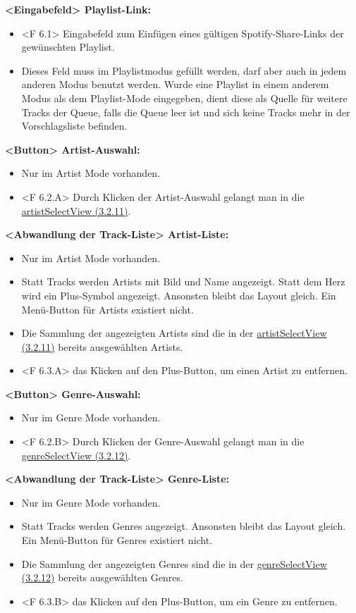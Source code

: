 \documentclass[oneside, ngerman]{sdqtechreport}
\begin{document}
\textbf{<Eingabefeld> Playlist-Link:}
\begin{itemize}
    \item <F 6.1> Eingabefeld zum Einfügen eines gültigen Spotify-Share-Links der gewünschten Playlist.
    \item Dieses Feld muss im Playlistmodus gefüllt werden, darf aber auch in jedem anderen Modus benutzt werden. Wurde eine Playlist in einem anderem Modus als dem Playlist-Mode eingegeben, dient diese als Quelle für weitere Tracks der Queue, falls die Queue leer ist und sich keine Tracks mehr in der Vorschlagsliste befinden.
\end{itemize}

\textbf{<Button> Artist-Auswahl:}
\begin{itemize}
    \item Nur im Artist Mode vorhanden.
    \item <F 6.2.A> Durch Klicken der Artist-Auswahl gelangt man in die \hyperlink{artistSelectView}{artistSelectView (3.2.11)}.
\end{itemize}

\textbf{<Abwandlung der Track-Liste> Artist-Liste:}
\begin{itemize}
    \item Nur im Artist Mode vorhanden.
    \item Statt Tracks werden Artists mit Bild und Name angezeigt. Statt dem Herz wird ein Plus-Symbol angezeigt. Ansonsten bleibt das Layout gleich. Ein Menü-Button für Artists existiert nicht.
    \item Die Sammlung der angezeigten Artists sind die in der \hyperlink{artistSelectView}{artistSelectView (3.2.11)} bereits ausgewählten Artists. 
    \item <F 6.3.A> das Klicken auf den Plus-Button, um einen Artist zu entfernen.
\end{itemize}

\textbf{<Button> Genre-Auswahl:}
\begin{itemize}
    \item Nur im Genre Mode vorhanden.
    \item <F 6.2.B> Durch Klicken der Genre-Auswahl gelangt man in die  \hyperlink{genreSelectView}{genreSelectView (3.2.12)}.
\end{itemize}

\textbf{<Abwandlung der Track-Liste> Genre-Liste:}
\begin{itemize}
    \item Nur im Genre Mode vorhanden.
    \item Statt Tracks werden Genres angezeigt. Ansonsten bleibt das Layout gleich. Ein Menü-Button für Genres existiert nicht.
    \item Die Sammlung der angezeigten Genres sind die in der \hyperlink{genreSelectView}{genreSelectView (3.2.12)} bereits ausgewählten Genres. 
    \item <F 6.3.B> das Klicken auf den Plus-Button, um ein Genre zu entfernen.
\end{itemize}
\end{document}
